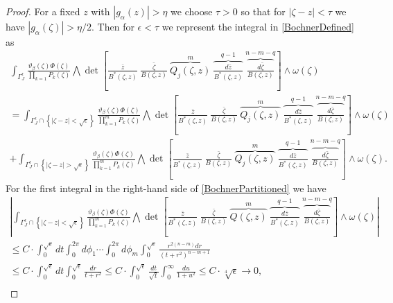 \documentclass[11pt,reqno]{amsart}
\numberwithin{equation}{section}
\begin{document}
\begin{proof} For a fixed $z$ with $|g_{\alpha}(z)|>\eta$ we choose $\tau>0$ so that for
$|\zeta-z|<\tau$ we have $|g_{\alpha}(\zeta)|>\eta/2$. Then for $\epsilon<\tau$
we represent the integral in \eqref{BochnerDefined} as
\begin{multline}\label{BochnerPartitioned}
\int_{\Gamma^{\epsilon}_J}
\frac{\vartheta_{\beta}(\zeta)\Phi(\zeta)}{\prod_{k=1}P_k(\zeta)}
\bigwedge\det\left[\frac{\bar z}{B^*(\zeta,z)}\ \frac{\bar\zeta}{B(\zeta,z)}\
\overbrace{Q_j(\zeta,z)}^{m}\
\overbrace{\frac{d{\bar z}}{B^*(\zeta,z)}}^{q-1}\
\overbrace{\frac{d{\bar\zeta}}{B(\zeta,z)}}^{n-m-q}\right]\wedge\omega(\zeta)\\
=\int_{\Gamma^{\epsilon}_J\cap\left\{|\zeta-z|<\sqrt{\epsilon}\right\}}
\frac{\vartheta_{\beta}(\zeta)\Phi(\zeta)}{\prod_{k=1}^mP_k(\zeta)}
\bigwedge\det\left[\frac{\bar z}{B^*(\zeta,z)}\ \frac{\bar\zeta}{B(\zeta,z)}\
\overbrace{Q_j(\zeta,z)}^{m}\
\overbrace{\frac{d{\bar z}}{B^*(\zeta,z)}}^{q-1}\
\overbrace{\frac{d{\bar\zeta}}{B(\zeta,z)}}^{n-m-q}\right]\wedge\omega(\zeta)\\
+\int_{\Gamma^{\epsilon}_J\cap\left\{|\zeta-z|>\sqrt{\epsilon}\right\}}
\frac{\vartheta_{\beta}(\zeta)\Phi(\zeta)}{\prod_{k=1}^mP_k(\zeta)}
\bigwedge\det\left[\frac{\bar z}{B^*(\zeta,z)}\ \frac{\bar\zeta}{B(\zeta,z)}\
\overbrace{Q_j(\zeta,z)}^{m}\
\overbrace{\frac{d{\bar z}}{B^*(\zeta,z)}}^{q-1}\
\overbrace{\frac{d{\bar\zeta}}{B(\zeta,z)}}^{n-m-q}\right]\wedge\omega(\zeta).
\end{multline}
\indent
For the first integral in the right-hand side of \eqref{BochnerPartitioned} we have
\begin{multline}\label{FirstBochnerBounded}
\left|\int_{\Gamma^{\epsilon}_J\cap\left\{|\zeta-z|<\sqrt{\epsilon}\right\}}
\frac{\vartheta_{\beta}(\zeta)\Phi(\zeta)}{\prod_{k=1}^mP_k(\zeta)}
\bigwedge\det\left[\frac{\bar z}{B^*(\zeta,z)}\ \frac{\bar\zeta}{B(\zeta,z)}\
\overbrace{Q(\zeta,z)}^{m}\
\overbrace{\frac{d{\bar z}}{B^*(\zeta,z)}}^{q-1}\
\overbrace{\frac{d{\bar\zeta}}{B(\zeta,z)}}^{n-m-q}\right]\wedge\omega(\zeta)\right|\\
\leq C\cdot\int_0^{\sqrt{\epsilon}}dt\int_0^{2\pi} d\phi_1\cdots\int_0^{2\pi} d\phi_m
\int_0^{\sqrt{\epsilon}}\frac{r^{2(n-m)}dr}
{\left(t+r^2\right)^{n-m+1}}\\
\leq C\cdot\int_0^{\sqrt{\epsilon}}dt\int_0^{\sqrt{\epsilon}}\frac{dr}{t+r^2}
\leq C\cdot\int_0^{\sqrt{\epsilon}}\frac{dt}{\sqrt{t}}\int_0^{\infty}\frac{du}{1+u^2}
\leq C\cdot\sqrt[4]{\epsilon}\rightarrow 0,\\

\end{multline}
\end{proof}
\end{document}
